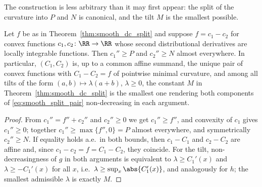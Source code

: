 The construction is less arbitrary than it may first appear: the split of the curvature into $P$ and $N$ is canonical, and the tilt $M$ is the smallest possible.

\begin{proposition}\label{prop:curvature_minimality}
Let $f$ be as in Theorem~\ref{thm:smooth_dc_split} and suppose $f = c_1 - c_2$ for convex functions $c_1, c_2 \colon \RR \to \RR$ whose second distributional derivatives are locally integrable functions. Then $c_1'' \ge P$ and $c_2'' \ge N$ almost everywhere. In particular, $(C_1, C_2)$ is, up to a common affine summand, the unique pair of convex functions with $C_1 - C_2 = f$ of pointwise minimal curvature, and among all tilts of the form $(a,b) \mapsto \lambda(a+b)$, $\lambda \ge 0$, the constant $M$ in Theorem~\ref{thm:smooth_dc_split} is the smallest one rendering both components of \eqref{eq:smooth_split_pair} non-decreasing in each argument.
\end{proposition}

\begin{proof}
From $c_1'' = f'' + c_2''$ and $c_2'' \ge 0$ we get $c_1'' \ge f''$, and convexity of $c_1$ gives $c_1'' \ge 0$; together $c_1'' \ge \max\{f'', 0\} = P$ almost everywhere, and symmetrically $c_2'' \ge N$. If equality holds a.e.\ in both bounds, then $c_1 - C_1$ and $c_2 - C_2$ are affine and, since $c_1 - c_2 = f = C_1 - C_2$, they coincide. For the tilt, non-decreasingness of $g$ in both arguments is equivalent to $\lambda \ge C_1'(x)$ and $\lambda \ge -C_1'(x)$ for all $x$, i.e.\ $\lambda \ge \sup_x \abs{C_1'(x)}$, and analogously for $h$; the smallest admissible $\lambda$ is exactly $M$.
\end{proof}

